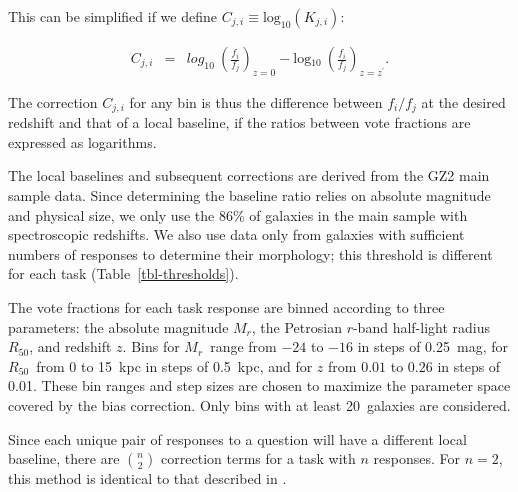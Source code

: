\documentclass[useAMS,usenatbib]{mn2e}
\newcommand{\mr}{$M_r$}
\newcommand{\rfifty}{$R_{50}$}
\newcommand{\redshift}{$z$}
\begin{document}
\noindent This can be simplified if we define $C_{j,i}\equiv\text{log}_{10}(K_{j,i})$:

\begin{eqnarray}
C_{j,i} &=& \text{$log_{10}$}~\left(\frac{f_i}{f_j}\right)_{z=0} - \text{log$_{10}$}~\left(\frac{f_i}{f_j}\right)_{z=z^\prime}.
\label{eqnarray-adjprob4}
\end{eqnarray}

\noindent The correction $C_{j,i}$ for any bin is thus the difference between $f_i/f_j$ at the desired redshift and that of a local baseline, if the ratios between vote fractions are expressed as logarithms.  

The local baselines and subsequent corrections are derived from the GZ2 main sample data. Since determining the baseline ratio relies on absolute magnitude and physical size, we only use the 86\% of galaxies in the main sample with spectroscopic redshifts. We also use data only from galaxies with sufficient numbers of responses to determine their morphology; this threshold is different for each task (Table~\ref{tbl-thresholds}).  

The vote fractions for each task response are binned according to three parameters: the absolute magnitude \mr, the Petrosian $r$-band half-light radius \rfifty, and redshift $z$. Bins for \mr~range from $-24$ to $-16$ in steps of 0.25~mag, for \rfifty~from 0 to 15~kpc in steps of 0.5~kpc, and for $z$ from $0.01$ to $0.26$ in steps of 0.01. These bin ranges and step sizes are chosen to maximize the parameter space covered by the bias correction. Only bins with at least 20~galaxies are considered. %

Since each unique pair of responses to a question will have a different local baseline, there are $\binom{n}{2}$ correction terms for a task with $n$ responses. For $n=2$, this method is identical to that described in \citet{bam09}. 
\end{document}
